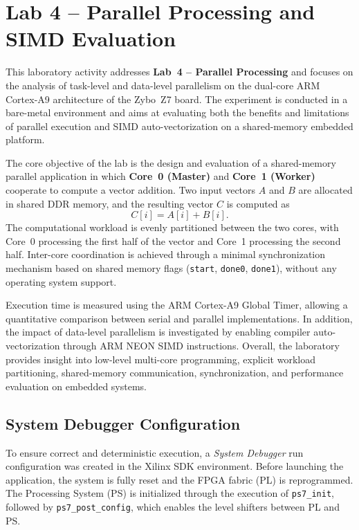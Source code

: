 \section*{Lab 4 -- Parallel Processing and SIMD Evaluation}

This laboratory activity addresses \textbf{Lab~4 -- Parallel Processing} and focuses on the
analysis of task-level and data-level parallelism on the dual-core ARM Cortex-A9
architecture of the Zybo~Z7 board. The experiment is conducted in a bare-metal
environment and aims at evaluating both the benefits and limitations of parallel
execution and SIMD auto-vectorization on a shared-memory embedded platform.

The core objective of the lab is the design and evaluation of a shared-memory
parallel application in which \textbf{Core~0 (Master)} and \textbf{Core~1 (Worker)}
cooperate to compute a vector addition. Two input vectors $A$ and $B$ are allocated
in shared DDR memory, and the resulting vector $C$ is computed as
\[
C[i] = A[i] + B[i].
\]
The computational workload is evenly partitioned between the two cores, with
Core~0 processing the first half of the vector and Core~1 processing the second half.
Inter-core coordination is achieved through a minimal synchronization mechanism
based on shared memory flags (\texttt{start}, \texttt{done0}, \texttt{done1}), without
any operating system support.

Execution time is measured using the ARM Cortex-A9 Global Timer, allowing a
quantitative comparison between serial and parallel implementations. In addition,
the impact of data-level parallelism is investigated by enabling compiler
auto-vectorization through ARM NEON SIMD instructions. Overall, the laboratory
provides insight into low-level multi-core programming, explicit workload
partitioning, shared-memory communication, synchronization, and performance
evaluation on embedded systems.

\subsection*{System Debugger Configuration}

To ensure correct and deterministic execution, a \textit{System Debugger} run
configuration was created in the Xilinx SDK environment. Before launching the
application, the system is fully reset and the FPGA fabric (PL) is reprogrammed.
The Processing System (PS) is initialized through the execution of
\texttt{ps7\_init}, followed by \texttt{ps7\_post\_config}, which enables the
level shifters between PL and PS.

